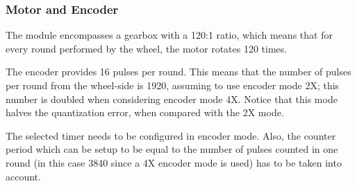 \documentclass[english]{article}
\begin{document}
\subsubsection{Motor and Encoder}
The module encompasses a gearbox with a 120:1 ratio, which means that for every round performed by the wheel, the motor rotates 120 times. 

The encoder provides 16 pulses per round. This means that the number of pulses per round from the wheel-side is 1920, assuming to use encoder mode 2X; this number is doubled when considering encoder mode 4X. Notice that this mode halves the quantization error, when compared with the 2X mode. 

The selected timer needs to be configured in encoder mode. Also, the counter period which can be setup to be equal to the number of pulses counted in one round (in this case 3840 since a 4X encoder mode is used) has to be taken into account. 
\end{document}
